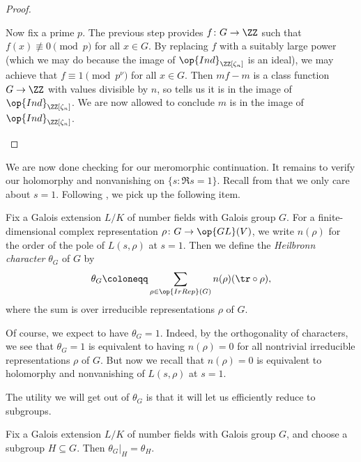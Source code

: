 \documentclass[../thesis.tex]{subfiles}
\begin{document}
\begin{proof}
\begin{enumerate}
		Now fix a prime $p$. The previous step provides $f\colon G\to\ZZ$ such that $f(x)\not\equiv0\pmod p$ for all $x\in G$. By replacing $f$ with a suitably large power (which we may do because the image of $\op{Ind}_{\ZZ[\zeta_n]}$ is an ideal), we may achieve that $f\equiv1\pmod{p^\nu}$ for all $x\in G$. Then $mf-m$ is a class function $G\to\ZZ$ with values divisible by $n$, so  tells us it is in the image of $\op{Ind}_{\ZZ[\zeta_n]}$. We are now allowed to conclude $m$ is in the image of $\op{Ind}_{\ZZ[\zeta_n]}$.
		\qedhere
	\end{enumerate}
\end{proof}

We are now done checking for our meromorphic continuation. It remains to verify our holomorphy and nonvanishing on $\{s:\Re s=1\}$. Recall from  that we only care about $s=1$. Following \cite[Section~11.4]{murty-alg-nt}, we pick up the following item.
\begin{definition}
	Fix a Galois extension $L/K$ of number fields with Galois group $G$. For a finite-dimensional complex representation $\rho\colon G\to\op{GL}(V)$, we write $n(\rho)$ for the order of the pole of $L(s,\rho)$ at $s=1$. Then we define the \textit{Heilbronn character} $\theta_G$ of $G$ by
	\[\theta_G\coloneqq\sum_{\rho\in\op{IrRep}(G)}n(\rho)({\tr}\circ\rho),\]
	where the sum is over irreducible representations $\rho$ of $G$.
\end{definition}
\begin{remark} \label{rem:use-heilbronn}
	Of course, we expect to have $\theta_G=1$. Indeed, by the orthogonality of characters, we see that $\theta_G=1$ is equivalent to having $n(\rho)=0$ for all nontrivial irreducible representations $\rho$ of $G$. But now we recall that $n(\rho)=0$ is equivalent to holomorphy and nonvanishing of $L(s,\rho)$ at $s=1$.
\end{remark}
The utility we will get out of $\theta_G$ is that it will let us efficiently reduce to subgroups.
\begin{lemma} \label{lem:restrict-heilbronn}
	Fix a Galois extension $L/K$ of number fields with Galois group $G$, and choose a subgroup $H\subseteq G$. Then $\theta_G|_H=\theta_H$.
\end{lemma}
\end{document}
